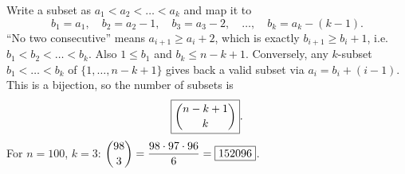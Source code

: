 Write a subset as $a_1<a_2<\dots<a_k$ and map it to
\[
b_1=a_1,\quad b_2=a_2-1,\quad b_3=a_3-2,\quad\dots,\quad b_k=a_k-(k-1).
\]
``No two consecutive'' means $a_{i+1}\ge a_i+2$, which is exactly $b_{i+1}\ge b_i+1$, i.e.\ $b_1<b_2<\dots<b_k$. Also $1\le b_1$ and $b_k\le n-k+1$. Conversely, any $k$-subset $b_1<\dots<b_k$ of $\{1,\dots,n-k+1\}$ gives back a valid subset via $a_i=b_i+(i-1)$. This is a bijection, so the number of subsets is
\[
\boxed{\dbinom{n-k+1}{k}} .
\]
For $n=100$, $k=3$: $\dbinom{98}{3}=\dfrac{98\cdot97\cdot96}{6}=\boxed{152096}$.
